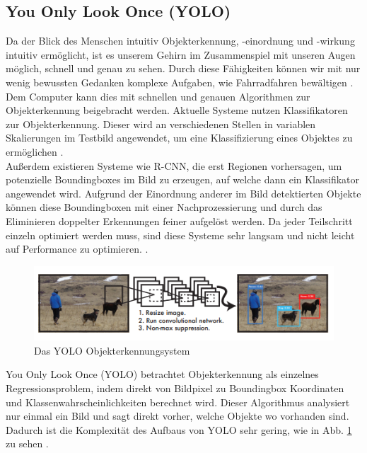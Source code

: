 {	\subsection{You Only Look Once (YOLO)}
	{Da der Blick des Menschen intuitiv Objekterkennung, -einordnung und -wirkung intuitiv ermöglicht, ist es unserem Gehirn im Zusammenspiel mit unseren Augen möglich, schnell und genau zu sehen. Durch diese Fähigkeiten können wir mit nur wenig bewussten Gedanken komplexe Aufgaben, wie Fahrradfahren bewältigen \citep{Plastiras2018}. \\
	Dem Computer kann dies mit schnellen und genauen Algorithmen zur Objekterkennung beigebracht werden. Aktuelle Systeme nutzen Klassifikatoren zur Objekterkennung. Dieser wird an verschiedenen Stellen in variablen Skalierungen im Testbild angewendet, um eine Klassifizierung eines Objektes zu ermöglichen \citep{Plastiras2018}. \\ 
	Außerdem existieren Systeme wie R-CNN, die erst Regionen vorhersagen, um potenzielle Boundingboxes im Bild zu erzeugen, auf welche dann ein Klassifikator angewendet wird. Aufgrund der Einordnung anderer im Bild detektierten Objekte können diese Boundingboxen mit einer Nachprozessierung und durch das Eliminieren doppelter Erkennungen feiner aufgelöst werden. Da jeder Teilschritt einzeln optimiert werden muss, sind diese Systeme sehr langsam und nicht leicht auf Performance zu optimieren. \citep{Plastiras2018}. \\
	\begin{figure}[ht]
		\centering
		\includegraphics*[scale = 1, keepaspectratio, trim=2 2 2 2 ]{images/YOLO/YOLO_detection_system.png}
		\caption[Das YOLO Objekterkennungsystem]{Das YOLO Objekterkennungsystem \citep{Plastiras2018}}
		\label{YOLO_Objecterkennungssystem}
 	\end{figure}
	\glqq You Only Look Once\grqq{} (YOLO) betrachtet Objekterkennung als einzelnes Regressionsproblem, indem direkt von Bildpixel zu Boundingbox Koordinaten und Klassenwahrscheinlichkeiten berechnet wird. Dieser Algorithmus analysiert nur einmal ein Bild und sagt direkt vorher, welche Objekte wo vorhanden sind. Dadurch ist die Komplexität des  Aufbaus von YOLO sehr gering, wie in Abb. \ref{YOLO_Objecterkennungssystem} zu sehen \citep{Plastiras2018}. \\
}}
